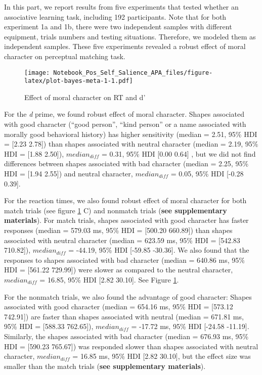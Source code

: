 \documentclass[
  man]{apa6}
\begin{document}
In this part, we report results from five experiments that tested whether an associative learning task, including 192 participants. Note that for both experiment 1a and 1b, there were two independent samples with different equipment, trials numbers and testing situations. Therefore, we modeled them as independent samples. These five experiments revealed a robust effect of moral character on perceptual matching task.

\begin{figure}
\centering
\texttt{[image: Notebook\_Pos\_Self\_Salience\_APA\_files/figure-latex/plot-bayes-meta-1-1.pdf]}
\caption{\label{fig:plot-bayes-meta-1}Effect of moral character on RT and d'}
\end{figure}

For the \emph{d} prime, we found robust effect of moral character. Shapes associated with good character (``good person'', ``kind person'' or a name associated with morally good behavioral history) has higher sensitivity (median = 2.51, 95\% HDI = {[}2.23 2.78{]}) than shapes associated with neutral character (median = 2.19, 95\% HDI = {[}1.88 2.50{]}), \(median_{diff}\) = 0.31, 95\% HDI {[}0.00 0.64{]} , but we did not find differences between shapes associated with bad character (median = 2.25, 95\% HDI = {[}1.94 2.55{]}) and neutral character, \(median_{diff}\) = 0.05, 95\% HDI {[}-0.28 0.39{]}.

For the reaction times, we also found robust effect of moral character for both match trials (see figure \ref{fig:plot-bayes-meta-1} C) and nonmatch trials (\textbf{see supplementary materials}). For match trials, shapes associated with good character has faster responses (median = 579.03 ms, 95\% HDI = {[}500.20 660.89{]}) than shapes associated with neutral character (median = 623.59 ms, 95\% HDI = {[}542.83 710.82{]}), \(median_{diff}\) = -44.19, 95\% HDI {[}-59.85 -30.36{]}. We also found that the responses to shapes associated with bad character (median = 640.86 ms, 95\% HDI = {[}561.22 729.99{]}) were slower as compared to the neutral character, \(median_{diff}\) = 16.85, 95\% HDI {[}2.82 30.10{]}. See Figure \ref{fig:plot-bayes-meta-1}.

For the nonmatch trials, we also found the advantage of good character: Shapes associated with good character (median = 654.16 ms, 95\% HDI = {[}573.12 742.91{]}) are faster than shapes associated with neutral (median = 671.81 ms, 95\% HDI = {[}588.33 762.65{]}), \(median_{diff}\) = -17.72 ms, 95\% HDI {[}-24.58 -11.19{]}. Similarly, the shapes associated with bad character (median = 676.93 ms, 95\% HDI = {[}590.23 765.67{]}) was responded slower than shapes associated with neutral character, \(median_{diff}\) = 16.85 ms, 95\% HDI {[}2.82 30.10{]}, but the effect size was smaller than the match trials (\textbf{see supplementary materials}).
\end{document}
